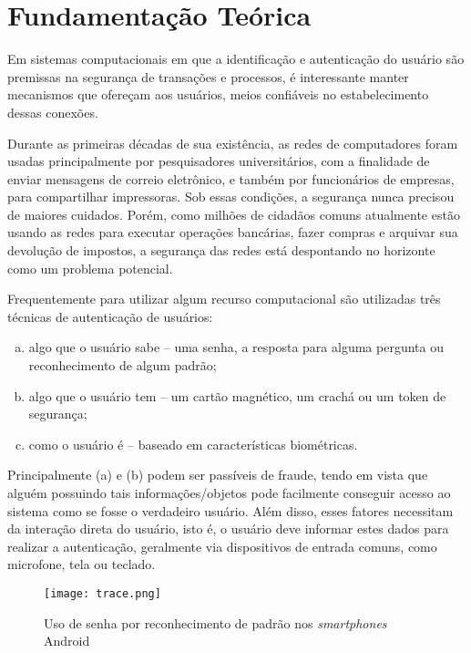 \chapter{Fundamentação Teórica}
Em sistemas computacionais em que a identificação e autenticação do usuário são premissas na segurança de transações e processos, é interessante manter mecanismos que ofereçam aos usuários, meios confiáveis no estabelecimento dessas conexões.
\begin{citacao}
Durante as primeiras décadas de sua existência, as redes de computadores foram usadas principalmente por pesquisadores universitários, com a finalidade de enviar mensagens de correio eletrônico, e também por funcionários de empresas, para compartilhar impressoras. Sob essas condições, a segurança nunca precisou de maiores cuidados. Porém, como milhões de cidadãos comuns atualmente estão usando as redes para executar operações bancárias, fazer compras e arquivar sua devolução de impostos, a segurança das redes está despontando no horizonte como um problema potencial.\cite{tanenbaum2003redes}
\end{citacao}
Frequentemente para utilizar algum recurso computacional são utilizadas três técnicas de autenticação de usuários:
\begin{enumerate}[(a)]
\item algo que o usuário sabe – uma senha, a resposta para alguma pergunta ou reconhecimento de algum padrão;
\item algo que o usuário tem – um cartão magnético, um crachá ou um token de segurança;
\item como o usuário é – baseado em características biométricas.
\end{enumerate}

Principalmente (a) e (b) podem ser passíveis de fraude, tendo em vista que alguém possuindo tais informações/objetos pode facilmente conseguir acesso ao sistema como se fosse o verdadeiro usuário. Além disso, esses fatores necessitam da interação direta do usuário, isto é, o usuário deve informar estes dados para realizar a autenticação, geralmente via dispositivos de entrada comuns, como microfone, tela ou teclado.

\begin{figure}[!htb]
	\centering
	\texttt{[image: trace.png]} %
	\small
	\caption[Uso de senha por reconhecimento de padrão]{Uso de senha por reconhecimento de padrão nos \textit{smartphones} Android}
	\label{fig:trace}
\end{figure}